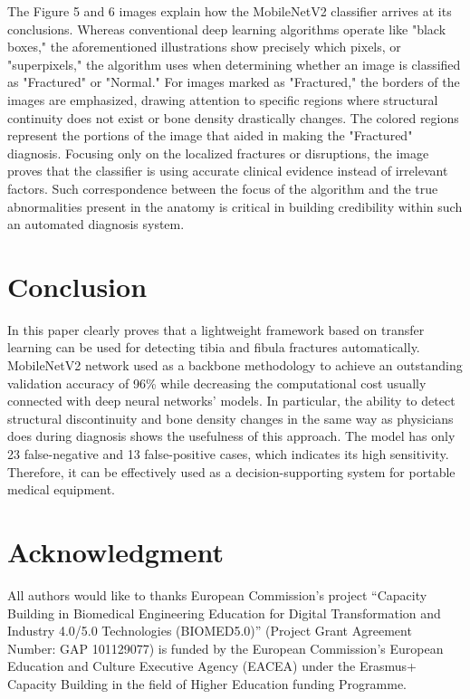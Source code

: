 \documentclass[conference]{IEEEtran}
\begin{document}
The Figure 5 and 6 images explain how the MobileNetV2 classifier arrives at its conclusions. Whereas conventional deep learning algorithms operate like "black boxes," the aforementioned illustrations show precisely which pixels, or "superpixels," the algorithm uses when determining whether an image is classified as "Fractured" or "Normal." For images marked as "Fractured," the borders of the images are emphasized, drawing attention to specific regions where structural continuity does not exist or bone density drastically changes. The colored regions represent the portions of the image that aided in making the "Fractured" diagnosis. Focusing only on the localized fractures or disruptions, the image proves that the classifier is using accurate clinical evidence instead of irrelevant factors. Such correspondence between the focus of the algorithm and the true abnormalities present in the anatomy is critical in building credibility within such an automated diagnosis system. 
\section{Conclusion}

In this paper clearly proves that a lightweight framework based on transfer learning can be used for detecting tibia and fibula fractures automatically. MobileNetV2 network used as a backbone methodology to achieve an outstanding validation accuracy of 96\% while decreasing the computational cost usually connected with deep neural networks' models. In particular, the ability to detect structural discontinuity and bone density changes in the same way as physicians does during diagnosis shows the usefulness of this approach. The model has only 23 false-negative and 13 false-positive cases, which indicates its high sensitivity. Therefore, it can be effectively used as a decision-supporting system for portable medical equipment.

\section*{Acknowledgment}
All authors would like to thanks European Commission’s project “Capacity Building in Biomedical Engineering Education for Digital Transformation and Industry 4.0/5.0 Technologies (BIOMED5.0)” (Project Grant Agreement Number: GAP 101129077) is funded by the European Commission’s European Education and Culture Executive Agency (EACEA) under the Erasmus+ Capacity Building in the field of Higher Education funding Programme.
\end{document}

